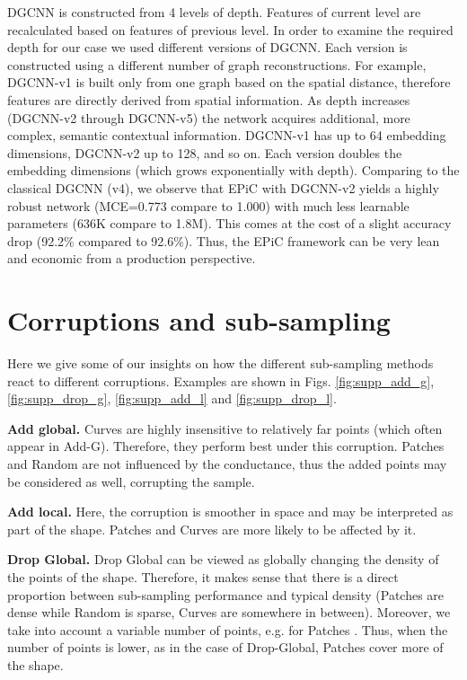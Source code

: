 \documentclass[10pt,twocolumn]{article}
\begin{document}
DGCNN is constructed from 4 levels of depth. Features of current level are recalculated based on features of previous level. In order to examine the required depth for our case we used different versions of DGCNN. Each version is constructed using a different number of graph reconstructions. For example, DGCNN-v1 is built only from one graph based on the spatial distance, therefore features are directly derived from  spatial information. As depth increases (DGCNN-v2 through DGCNN-v5) the network acquires additional, more complex,  semantic contextual information. DGCNN-v1 has up to 64 embedding dimensions, DGCNN-v2 up to 128, and so on. Each version doubles the embedding dimensions  (which grows exponentially with depth).
Comparing to the classical DGCNN (v4), we observe  that EPiC with DGCNN-v2 yields a highly robust network (MCE=0.773 compare to 1.000) with much less learnable parameters (636K compare to 1.8M). This comes at the cost of a slight accuracy drop (92.2\% compared to 92.6\%). Thus, the EPiC framework can be very lean and economic from a production perspective.


\section{Corruptions and sub-sampling}


Here we give some of our insights on how the different sub-sampling methods react to different corruptions. Examples are shown in Figs. \ref{fig:supp_add_g}, \ref{fig:supp_drop_g}, \ref{fig:supp_add_l} and \ref{fig:supp_drop_l}.

{\bf Add global.} Curves are highly insensitive to relatively far points (which often appear in Add-G). Therefore, they perform best under this corruption. Patches and Random are not influenced by the conductance, thus the added points may be considered as well, corrupting the sample. 

{\bf Add local.} Here, the corruption is smoother in space and may be interpreted as part of the shape. Patches and Curves are more likely to be affected by it. 

{\bf Drop Global.} Drop Global can be viewed as globally changing the density of the points of the shape. Therefore, it makes sense that there is a direct proportion between sub-sampling performance and typical density (Patches are dense while Random is sparse, Curves are somewhere in between).
Moreover, we take into account a variable number of points, e.g. for Patches . Thus, when the number of points is lower, as in the case of Drop-Global, Patches cover more of the shape.
\end{document}
